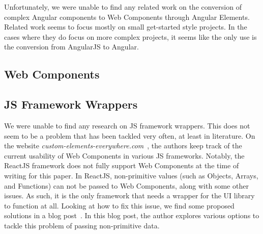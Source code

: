 Unfortunately, we were unable to find any related work on the conversion of complex Angular components to Web Components through Angular Elements. Related work seems to focus mostly on small get-started style projects. In the cases where they do focus on more complex projects, it seems like the only use is the conversion from AngularJS to Angular.

\subsection{Web Components}

\subsection{JS Framework Wrappers}
We were unable to find any research on JS framework wrappers. This does not seem to be a problem that has been tackled very often, at least in literature. On the website \emph{custom-elements-everywhere.com}~, the authors keep track of the current usability of Web Components in various JS frameworks. Notably, the ReactJS framework does not fully support Web Components at the time of writing for this paper. In ReactJS, non-primitive values (such as Objects, Arrays, and Functions) can not be passed to Web Components, along with some other issues. As such, it is the only framework that needs a wrapper for the UI library to function at all. Looking at how to fix this issue, we find some proposed solutions in a blog post~. In this blog post, the author explores various options to tackle this problem of passing non-primitive data.